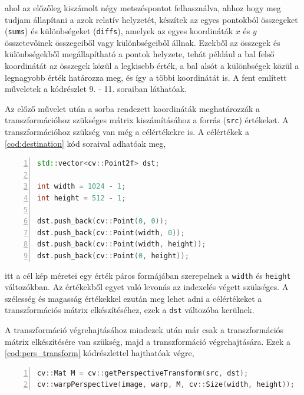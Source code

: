\par ahol az előzőleg kiszámolt négy metszéspontot felhasználva, ahhoz hogy meg tudjam állapítani a azok relatív helyzetét, készítek az egyes pontokból összegeket (\lstinline{sums}) és különbségeket (\lstinline{diffs}), amelyek az egyes koordináták $x$ és $y$ összetevőinek összegeiből vagy különbségeiből állnak. Ezekből az összegek és különbségekből megállapítható a pontok helyzete, tehát például a bal felső koordinátát az összegek közül a legkisebb érték, a bal alsót a különbségek közül a legnagyobb érték határozza meg, és így a többi koordinátát is. A fent említett műveletek a kódrészlet 9. - 11. soraiban láthatóak.
\par Az előző művelet után a sorba rendezett koordináták meghatározzák a transzformációhoz szükséges mátrix kiszámításához a forrás (\lstinline{src}) értékeket. A transzformációhoz szükség van még a célértékekre is.
\newline A célértékek a \ref{cod:destination} kód soraival adhatóak meg,

\vspace{2mm}
\hspace{-10mm}
\begin{minipage}{\linewidth}
\begin{lstlisting}[language=C++, numbers=left, caption={A kimeneti értékek megadása.}, label={cod:destination}]
std::vector<cv::Point2f> dst;

int width = 1024 - 1;
int height = 512 - 1;

dst.push_back(cv::Point(0, 0));
dst.push_back(cv::Point(width, 0));
dst.push_back(cv::Point(width, height));
dst.push_back(cv::Point(0, height));
\end{lstlisting}
\end{minipage}

\par itt a cél kép méretei egy érték páros formájában szerepelnek a \lstinline{width} és \lstinline{height} változókban. Az értékekből egyet való levonás az indexelés végett szükséges. A szélesség és magasság értékekkel ezután meg lehet adni a célértékeket a transzformációs mátrix elkészítéséhez, ezek a \lstinline{dst} változóba kerülnek.
\par A transzformáció végrehajtásához mindezek után már csak a transzformációs mátrix elkészítésére van szükség, majd a transzformáció végrehajtására.
\newline Ezek a \ref{cod:pers_transform} kódrészlettel hajthatóak végre,

\vspace{2mm}
\hspace{-10mm}
\begin{minipage}{\linewidth}
\begin{lstlisting}[language=C++, numbers=left, caption={A transzformáció végrehajtása.}, label={cod:pers_transform}]
cv::Mat M = cv::getPerspectiveTransform(src, dst);
cv::warpPerspective(image, warp, M, cv::Size(width, height));
\end{lstlisting}
\end{minipage}

